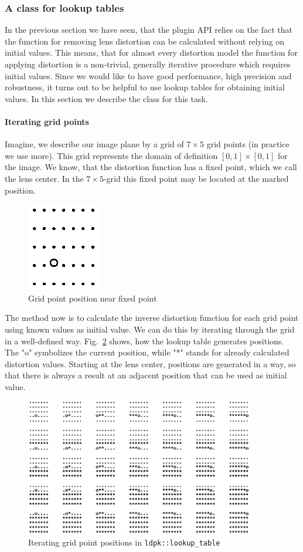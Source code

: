\documentclass[10pt,a4paper]{article}
\begin{document}
\subsubsection{A class for lookup tables}
In the previous section we have seen, that the plugin API relies on the fact that
the function for removing lens distortion can be calculated without relying on initial values.
This means, that for almost every distortion model the function for applying distortion
is a non-trivial, generally iterative procedure which requires initial values.
Since we would like to have good performance, high precision and robustness,
it turns out to be helpful to use lookup tables for obtaining initial values.
In this section we describe the class for this task.
\paragraph{Iterating grid points}
Imagine, we describe our image plane by a grid of $7\times 5$ grid points (in practice we use more).
This grid represents the domain of definition $[0,1]\times[0,1]$ for the image.
We know, that the distortion function has a fixed point, which we call the lens center.
In the $7\times 5$-grid this fixed point may be located at the marked position.
\begin{figure}[ht]
\label{fig:LookupTableStart}
\centering
\includegraphics{lookup_table_start.eps}
\caption{Grid point position near fixed point}
\end{figure}
The method now is to calculate the inverse distortion function for each grid point
using known values as initial value. We can do this by iterating through the grid
in a well-defined way.
Fig.~\ref{fig:LookupTableIter} shows, how the lookup table generates positions.
The "o" symbolizes the current position, while "*" stands for already calculated distortion values.
Starting at the lens center, positions are generated in a way, so that there is always
a result at an adjacent position that can be used as initial value.
\begin{figure}[ht]
\centering
\includegraphics[width=10cm]{lookup_table_iter.eps}
\caption{Iterating grid point positions in {\tt ldpk::lookup\_table}}
\label{fig:LookupTableIter}
\end{figure}
\end{document}
